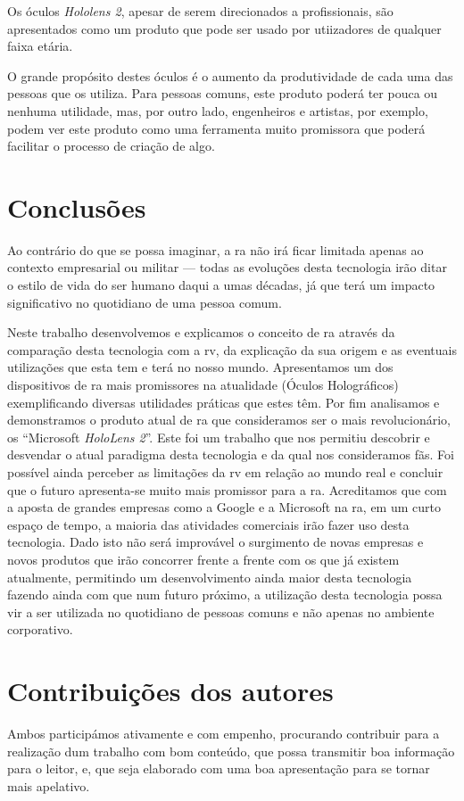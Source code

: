 \documentclass{report}
\begin{document}
Os óculos \textit{Hololens 2}, apesar de serem direcionados a profissionais, são apresentados como um produto que pode ser usado por utiizadores de qualquer faixa etária.

O grande propósito destes óculos é o aumento da produtividade de cada uma das pessoas que os utiliza.
Para pessoas comuns, este produto poderá ter pouca ou nenhuma utilidade, mas, por outro lado, engenheiros e artistas, por exemplo, podem ver este produto como uma ferramenta muito promissora que poderá facilitar o processo de criação de algo.

\chapter{Conclusões}
\label{chap.conclusao}

Ao contrário do que se possa imaginar, a \ac{ra} não irá ficar limitada apenas ao contexto empresarial ou militar — todas as evoluções desta tecnologia irão ditar o estilo de vida do ser humano daqui a umas décadas, já que terá um impacto significativo no quotidiano de uma pessoa comum.

Neste trabalho desenvolvemos e explicamos o conceito de \ac{ra} através da comparação desta tecnologia com a \ac{rv}, da explicação da sua origem e as eventuais utilizações que esta tem e terá no nosso mundo. Apresentamos um dos dispositivos de \ac{ra} mais promissores na atualidade (Óculos Holográficos) exemplificando diversas utilidades práticas que estes têm. Por fim analisamos e demonstramos o produto atual de \ac{ra} que consideramos ser o mais revolucionário, os “Microsoft \textit{HoloLens 2}”. Este foi um trabalho que nos permitiu descobrir e desvendar o atual paradigma desta tecnologia e da qual nos consideramos fãs. Foi possível ainda perceber as limitações da \ac{rv} em relação ao mundo real e concluir que o futuro apresenta-se muito mais promissor para a \ac{ra}. Acreditamos que com a aposta de grandes empresas como a Google e a Microsoft na \ac{ra}, em um curto espaço de tempo, a maioria das atividades comerciais irão fazer uso desta tecnologia. Dado isto não será improvável o surgimento de novas empresas e novos produtos que irão concorrer frente a frente com os que já existem atualmente, permitindo um desenvolvimento ainda maior desta tecnologia fazendo ainda com que num futuro próximo, a utilização desta tecnologia possa vir a ser utilizada no quotidiano de pessoas comuns e não apenas no ambiente corporativo.

\chapter*{Contribuições dos autores}
Ambos participámos ativamente e com empenho, procurando contribuir para a realização dum trabalho com bom conteúdo, que possa transmitir boa informação para o leitor, e, que seja elaborado com uma boa apresentação para se tornar mais apelativo.
\end{document}
